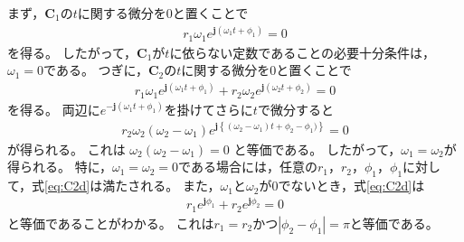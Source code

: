 \documentclass[tombow,dvipdfmx]{corona-a5-1.1}
\begin{document}
\begin{証明}
まず，$\bm{C}_1$の$t$に関する微分を0と置くことで
\begin{align*}
r_1 \omega_1 e^{ \bm{j} (\omega_1 t + \phi_1)}=0
\end{align*}
を得る。
したがって，$\bm{C}_1$が$t$に依らない定数であることの必要十分条件は，$\omega_1=0$である。
つぎに，$\bm{C}_2$の$t$に関する微分を0と置くことで
\begin{align}\label{eq:C2d}
r_1 \omega_1 e^{ \bm{j} (\omega_1 t + \phi_1)}
+ r_2 \omega_2 e^{ \bm{j} (\omega_2 t + \phi_2)}=0
\end{align}
を得る。
両辺に$e^{ -\bm{j} (\omega_1 t + \phi_1)}$を掛けてさらに$t$で微分すると
\begin{align*}
r_2 \omega_2 (\omega_2-\omega_1)
e^{ \bm{j} \left\{ 
(\omega_2-\omega_1) t + \phi_2 - \phi_1)
\right\}
}=0
\end{align*}
が得られる。
これは
$\omega_2 (\omega_2-\omega_1)=0$
と等価である。
したがって，$\omega_1 =\omega_2$が得られる。
特に，$\omega_1=\omega_2=0$である場合には，任意の$r_1$，$r_2$，$\phi_1$，$\phi_1$に対して，式\ref{eq:C2d}は満たされる。
また，$\omega_1$と$\omega_2$が0でないとき，式\ref{eq:C2d}は
\begin{align*}
r_1 e^{ \bm{j} \phi_1} + r_2 e^{ \bm{j} \phi_2} =0
\end{align*}
と等価であることがわかる。
これは$r_1=r_2$かつ$|\phi_2-\phi_1| = \pi$と等価である。


\end{証明}
\end{document}

